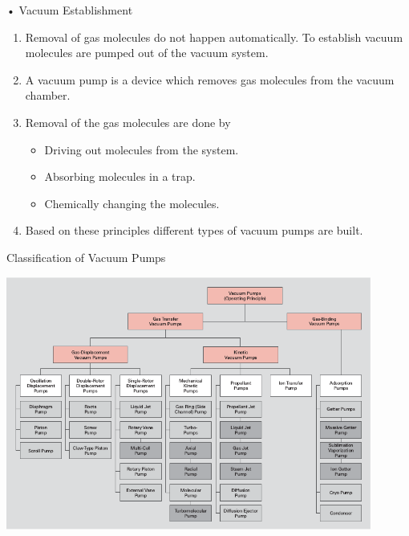 \documentclass[11]{beamer}
\begin{document}
\begin{frame}{• Vacuum Establishment}

\begin{exampleblock}

\begin{enumerate}

\item Removal of gas molecules do not happen automatically. To establish vacuum molecules are pumped out of the vacuum system.
\item A vacuum pump is a device which removes gas molecules from the vacuum chamber. 
\item Removal of the gas molecules are done by 
\begin{itemize}
 \item Driving out molecules from the system.
 \item Absorbing molecules in a trap.
 \item Chemically changing the molecules.
\end{itemize}
 
\item Based on these principles different types of vacuum pumps are built.

\end{enumerate}

\end{exampleblock}		


\end{frame}





\begin{frame}{Classification of Vacuum Pumps}
\begin{center}
\includegraphics[width=0.9\textwidth]{OverviewOfVacuumPumps.png}
\end{center}
\end{frame}
\end{document}
